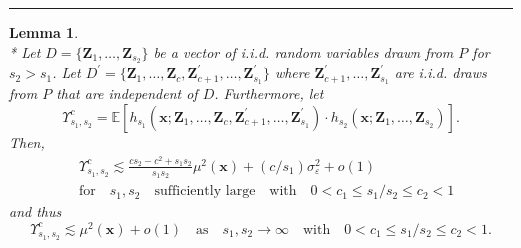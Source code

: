 \documentclass[letterpaper,10pt]{article}
\numberwithin{equation}{section}
\numberwithin{thm}{section}
\newtheorem{lem}{Lemma}
\numberwithin{lem}{section}
\numberwithin{cor}{section}
\newcommand{\E}{\mathbb{E}}
\newcommand{\1}{\mathbbm{1}}
\begin{document}
\hrule

\begin{lem}\label{lem:upsilon_sc}\mbox{}\\*
	Let $D = \{\mathbf{Z}_1, \dotsc, \mathbf{Z}_{s_2}\}$ be a vector of i.i.d. random variables drawn from $P$ for $s_2 > s_1$.
	Let $D^{\prime} = \{\mathbf{Z}_1, \dotsc, \mathbf{Z}_{c}, \mathbf{Z}_{c+1}^{\prime}, \dotsc,  \mathbf{Z}_{s_1}^{\prime}\}$ where $\mathbf{Z}_{c+1}^{\prime}, \dotsc,  \mathbf{Z}_{s_1}^{\prime}$ are i.i.d. draws from $P$ that are independent of $D$.
	Furthermore, let
	\begin{equation}
		\Upsilon_{s_1, s_2}^{c}
		= \E\left[h_{s_1}\left(\mathbf{x}; \mathbf{Z}_1, \ldots, \mathbf{Z}_c, \mathbf{Z}^{\prime}_{c+1}, \ldots,  \mathbf{Z}^{\prime}_{s_1}\right) \cdot
			h_{s_2}\left(\mathbf{x}; \mathbf{Z}_1, \ldots, \mathbf{Z}_{s_2}\right)\right].
	\end{equation}
	Then,
	\begin{equation}
		\begin{aligned}
			 & \Upsilon_{s_1, s_2}^{c}
			\lesssim \frac{c s_2 - c^2 + s_1 s_2}{s_1 s_2}\mu^2(\mathbf{x}) + (c/s_1) \sigma^2_{\varepsilon} + o(1) \\
			 & \text{for} \quad s_1, s_2 \quad \text{sufficiently large}
			\quad \text{with} \quad
			0 < c_1 \leq s_1 / s_2 \leq c_2 < 1
		\end{aligned}
	\end{equation}
	and thus
	\begin{equation}
		\Upsilon_{s_1, s_2}^{c}
		\lesssim \mu^2(\mathbf{x}) + o(1)
		\quad \text{as} \quad s_1, s_2 \rightarrow \infty
		\quad \text{with} \quad
		0 < c_1 \leq s_1 / s_2 \leq c_2 < 1.
	\end{equation}
\end{lem}
\end{document}
